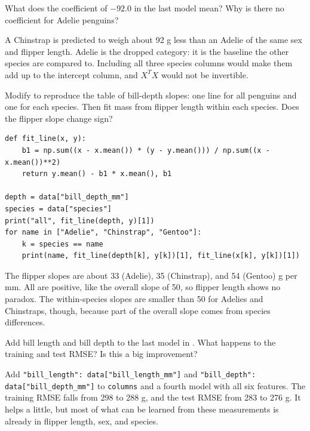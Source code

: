 \begin{Exercise}[label=slr3, title=Read the coefficients]
What does the coefficient of $-92.0$ in the last model mean? Why is there no coefficient for Adelie
penguins?
\end{Exercise}
\begin{Answer}[ref=slr3]
A Chinstrap is predicted to weigh about 92 g less than an Adelie of the same sex and flipper length. Adelie is
the dropped category: it is the baseline the other species are compared to. Including all three species
columns would make them add up to the intercept column, and $X^T X$ would not be invertible.
\end{Answer}

\begin{Exercise}[label=ls4, title={Your own Simpson's paradox}]
Modify  to reproduce the table of bill-depth slopes: one line for all penguins and one for
each species. Then fit mass from flipper length within each species. Does the flipper slope change sign?
\end{Exercise}
\begin{Answer}[ref=ls4]
\begin{verbatim}
def fit_line(x, y):
    b1 = np.sum((x - x.mean()) * (y - y.mean())) / np.sum((x - x.mean())**2)
    return y.mean() - b1 * x.mean(), b1

depth = data["bill_depth_mm"]
species = data["species"]
print("all", fit_line(depth, y)[1])
for name in ["Adelie", "Chinstrap", "Gentoo"]:
    k = species == name
    print(name, fit_line(depth[k], y[k])[1], fit_line(x[k], y[k])[1])
\end{verbatim}
The flipper slopes are about 33 (Adelie), 35 (Chinstrap), and 54 (Gentoo) g per mm. All are positive, like the
overall slope of 50, so flipper length shows no paradox. The within-species slopes are smaller than 50 for
Adelies and Chinstraps, though, because part of the overall slope comes from species differences.
\end{Answer}

\begin{Exercise}[label=ls5, title={Everything in}]
Add bill length and bill depth to the last model in . What happens to the training and
test RMSE? Is this a big improvement?
\end{Exercise}
\begin{Answer}[ref=ls5]
Add \verb|"bill_length": data["bill_length_mm"]| and \verb|"bill_depth": data["bill_depth_mm"]| to
\verb|columns| and a fourth model with all six features. The training RMSE falls from 298 to 288 g, and the
test RMSE from 283 to 276 g. It helps a little, but most of what can be learned from these measurements is
already in flipper length, sex, and species.
\end{Answer}

